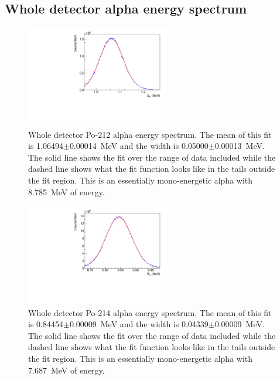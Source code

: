 \subsection{Whole detector alpha energy spectrum}
\begin{figure}[!h]
\centering
\includegraphics[width=0.56\textwidth]{figures/PubBiPo212AlphaE.pdf}
\caption{\label{fig:AlphaE212}Whole detector Po-212 alpha energy spectrum. The mean of this fit is 1.06494$\pm$0.00014~MeV and the width is 0.05000$\pm$0.00013~MeV. The solid line shows the fit over the range of data included while the dashed line shows what the fit function looks like in the tails outside the fit region. This is an essentially mono-energetic alpha with 8.785~MeV of energy.}
\end{figure}
\begin{figure}[!h]
\centering
\includegraphics[width=0.56\textwidth]{figures/PubBiPo214AlphaE.pdf}
\caption{\label{fig:AlphaE214}Whole detector Po-214 alpha energy spectrum. The mean of this fit is 0.84454$\pm$0.00009~MeV and the width is 0.04339$\pm$0.00009~MeV.  The solid line shows the fit over the range of data included while the dashed line shows what the fit function looks like in the tails outside the fit region. This is an essentially mono-energetic alpha with 7.687~MeV of energy.}
\end{figure}
\clearpage
\newpage
